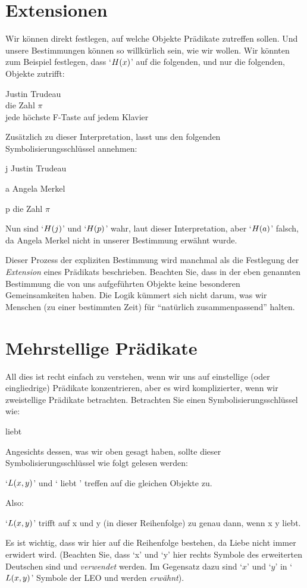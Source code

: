 \section{Extensionen}
Wir können direkt festlegen, auf welche Objekte Prädikate zutreffen sollen. Und unsere Bestimmungen können so willkürlich sein, wie wir wollen. Wir könnten zum Beispiel festlegen, dass `$\mathord{H}(x)$' auf die folgenden, und nur die folgenden, Objekte zutrifft:
	\begin{center}
		Justin Trudeau\\
		die Zahl $\pi$\\
		jede höchste F-Taste auf jedem Klavier
	\end{center}
Zusätzlich zu dieser Interpretation, lasst uns den folgenden Symbolisierungsschlüssel annehmen:
	\begin{ekey}
		\item[j] Justin Trudeau
		\item[a] Angela Merkel
		\item[p] die Zahl $\pi$
	\end{ekey}
Nun sind `$\mathord{H}(j)$' und `$\mathord{H}(p)$' wahr, laut dieser Interpretation, aber `$\mathord{H}(a)$' falsch, da Angela Merkel nicht in unserer Bestimmung erwähnt wurde. 

Dieser Prozess der expliziten Bestimmung wird manchmal als die Festlegung der \emph{Extension} eines Prädikats beschrieben. Beachten Sie, dass in der eben genannten Bestimmung die von uns aufgeführten Objekte keine besonderen Gemeinsamkeiten haben. Die Logik kümmert sich nicht darum, was wir Menschen (zu einer bestimmten Zeit) für ``natürlich zusammenpassend'' halten.

\section{Mehrstellige Prädikate}
All dies ist recht einfach zu verstehen, wenn wir uns auf einstellige (oder eingliedrige) Prädikate konzentrieren, aber es wird komplizierter, wenn wir zweistellige Prädikate betrachten. Betrachten Sie einen Symbolisierungsschlüssel wie:
	\begin{ekey}
		\item[\atom{L}{x,y}]  liebt 
	\end{ekey}
Angesichts dessen, was wir oben gesagt haben, sollte dieser Symbolisierungsschlüssel wie folgt gelesen werden:
	\begin{earg}
		\item[\textbullet] `$\mathord{L}(x,y)$' und ` liebt ' treffen auf die gleichen Objekte zu.
	\end{earg}
Also:
	\begin{earg}
		\item[\textbullet] `$\mathord{L}(x,y)$' trifft auf x und y (in dieser Reihenfolge) zu genau dann, wenn x y liebt. 
	\end{earg}
Es ist wichtig, dass wir hier auf die Reihenfolge bestehen, da Liebe nicht immer erwidert wird. (Beachten Sie, dass `x' und `y' hier rechts Symbole des erweiterten Deutschen sind und \emph{verwendet} werden. Im Gegensatz dazu sind `$x$' und `$y$' in `$\mathord{L}(x,y)$' Symbole der LEO und werden \emph{erwähnt}).

